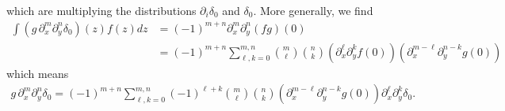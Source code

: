 \documentclass[12pt]{amsart}
\theoremstyle{remark}
\begin{document}
which are multiplying the distributions $\partial_i \delta_0$ and $\delta_0$.
More generally, we find
\begin{align*}
	\int (g\, \partial_x^m \partial_y^n \delta_0)(z) f(z) dz &= (-1)^{m+n} \partial_x^m \partial_y^n (fg)(0) \\
		&= (-1)^{m+n} \sum_{\ell,k=0}^{m,n} \binom{m}{\ell} \binom{n}{k}
		\left(\partial_{x}^{\ell} \partial_y^k f(0) \right) 
		\left(\partial_{x}^{m-\ell} \partial_y^{n-k} g(0) \right) 
\end{align*}
which means
\begin{align}
	g \, \partial_x^m \partial_y^n \delta_0 =
		(-1)^{m+n} \sum_{\ell,k=0}^{m,n} (-1)^{\ell + k}
		\binom{m}{\ell} \binom{n}{k}
		\left(\partial_{x}^{m-\ell} \partial_y^{n-k} g(0) \right) 
		\partial_{x}^{\ell} \partial_y^k \delta_0.
                \label{eq:func times partial delta}
\end{align}

\end{document}
